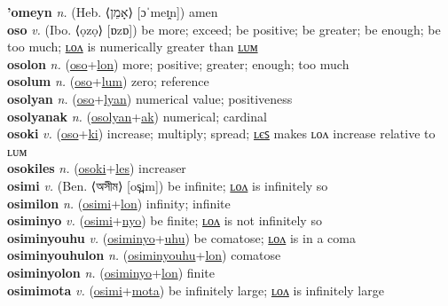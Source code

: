 \textbf{'omeyn} \textit{n.} (Heb. ⟨אָמֵן⟩ [ɔˈmeɪ̯n])
amen \label{'omeyn} \\
\textbf{oso} \textit{v.} (Ibo. ⟨ọzọ⟩ [ɒzɒ])
be more; exceed; be positive; be greater; be enough; be too much; \hyperref[osolon]{ʟᴏᴧ} is numerically greater than \hyperref[osolum]{ʟᴜᴍ} \label{oso} \\
\textbf{osolon} \textit{n.} (\hyperref[oso]{oso}+\hyperref[lon]{lon})
more; positive; greater; enough; too much \label{osolon} \\
\textbf{osolum} \textit{n.} (\hyperref[oso]{oso}+\hyperref[lum]{lum})
zero; reference \label{osolum} \\
\textbf{osolyan} \textit{n.} (\hyperref[oso]{oso}+\hyperref[lyan]{lyan})
numerical value; positiveness \label{osolyan} \\
\textbf{osolyanak} \textit{n.} (\hyperref[osolyan]{osolyan}+\hyperref[ak]{ak})
numerical; cardinal \label{osolyanak} \\
\textbf{osoki} \textit{v.} (\hyperref[oso]{oso}+\hyperref[ki]{ki})
increase; multiply; spread; \hyperref[osokiles]{ʟєꜱ} makes ʟᴏᴧ increase relative to ʟᴜᴍ \label{osoki} \\
\textbf{osokiles} \textit{n.} (\hyperref[osoki]{osoki}+\hyperref[les]{les})
increaser \label{osokiles} \\
\textbf{osimi} \textit{v.} (Ben. ⟨অসীম⟩ [os̪im])
be infinite; \hyperref[osimilon]{ʟᴏᴧ} is infinitely so \label{osimi} \\
\textbf{osimilon} \textit{n.} (\hyperref[osimi]{osimi}+\hyperref[lon]{lon})
infinity; infinite \label{osimilon} \\
\textbf{osiminyo} \textit{v.} (\hyperref[osimi]{osimi}+\hyperref[nyo]{nyo})
be finite; \hyperref[osiminyolon]{ʟᴏᴧ} is not infinitely so \label{osiminyo} \\
\textbf{osiminyouhu} \textit{v.} (\hyperref[osiminyo]{osiminyo}+\hyperref[uhu]{uhu})
be comatose; \hyperref[osiminyouhulon]{ʟᴏᴧ} is in a coma \label{osiminyouhu} \\
\textbf{osiminyouhulon} \textit{n.} (\hyperref[osiminyouhu]{osiminyouhu}+\hyperref[lon]{lon})
comatose \label{osiminyouhulon} \\
\textbf{osiminyolon} \textit{n.} (\hyperref[osiminyo]{osiminyo}+\hyperref[lon]{lon})
finite \label{osiminyolon} \\
\textbf{osimimota} \textit{v.} (\hyperref[osimi]{osimi}+\hyperref[mota]{mota})
be infinitely large; \hyperref[osimimotalon]{ʟᴏᴧ} is infinitely large \label{osimimota} \\
